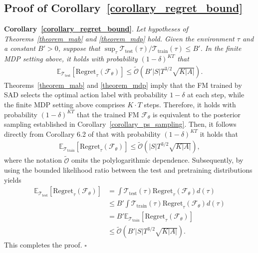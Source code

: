 \documentclass[10pt]{article}
\newenvironment{myproof}{{\noindent\it Proof. }}{\hfill $\square$ \par}
\def\mbE{{\ensuremath{\mathbb E}}}
\def\ccalF{{\ensuremath{\mathcal F}}}
\def\ccalO{{\ensuremath{\mathcal O}}}
\def\ccalT{{\ensuremath{\mathcal T}}}
\begin{document}
\subsection{Proof of Corollary~\ref{corollary_regret_bound}}
\label{appendix_omit_proof_corollary_regret_bound}
\textbf{Corollary~\ref{corollary_regret_bound}}.
\textit{
Let hypotheses of Theorems~\ref{theorem_mab}  and \ref{theorem_mdp} hold.
Given the environment $\tau$ and a constant $B' > 0$, suppose that $\sup_{\tau} {\ccalT_{\text{test}}(\tau)}/{\ccalT_{\text{train}}(\tau)} \leq B'$. In the finite MDP setting above, it holds with probability $(1-\delta)^{KT}$ that
\begin{align}\label{eqn_regret_dpt}
       \mbE_{\ccalT_{\text{test}}} \left[ \text{Regret}_\tau(\ccalF_{\theta}) \right]  \leq \widetilde{\ccalO} (B' |S| T^{3/2} \sqrt{K |A|}).
\end{align}
}
\begin{myproof}
    Theorems~\ref{theorem_mab} and \ref{theorem_mdp} imply that the FM trained by SAD selects the optimal action label with probability $1-\delta$ at each step, while the finite MDP setting above comprises $K \cdot T$ steps. Therefore, it holds with probability $(1-\delta)^{KT}$ that the trained FM $\ccalF_\theta$ is equivalent to the posterior sampling established in Corollary~\ref{corollary_ps_sampling}. Then, it follows directly from Corollary 6.2 of \citep{lee2024supervised} that with probability $(1-\delta)^{KT}$ it holds that
    \begin{align}
       \mbE_{\ccalT_{\text{train}}} \left[ \text{Regret}_\tau(\ccalF_{\theta}) \right]  \leq \widetilde{\ccalO} ( |S| T^{3/2} \sqrt{K |A|}),
\end{align}
    where the notation $\widetilde{\ccalO}$ omits the polylogarithmic dependence. Subsequently, by using the bounded likelihood ratio between the test and pretraining distributions yields
    \begin{align}
        \mbE_{\ccalT_{\text{test}}} \left[ \text{Regret}_\tau(\ccalF_{\theta}) \right] &= \int \ccalT_{\text{test}}(\tau) \text{Regret}_\tau(\ccalF_{\theta}) d(\tau) \\
        &\leq B' \int \ccalT_{\text{train}}(\tau) \text{Regret}_\tau(\ccalF_{\theta}) d(\tau) \\
        &=B' \mbE_{\ccalT_{\text{train}}} \left[ \text{Regret}_\tau(\ccalF_{\theta}) \right] \\
        &\leq \widetilde{\ccalO} (B' |S| T^{3/2} \sqrt{K |A|}).
    \end{align}
    This completes the proof.
\end{myproof}
\clearpage
\end{document}
